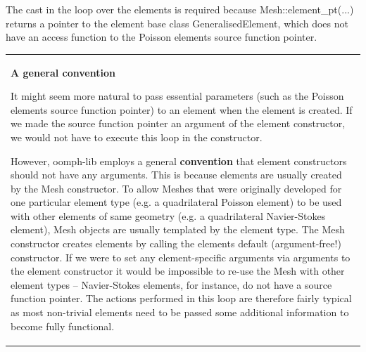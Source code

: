 The cast in the loop over the elements is required because {\ttfamily Mesh\+::element\+\_\+pt}(...) returns a pointer to the element base class {\ttfamily Generalised\+Element}, which does not have an access function to the Poisson element\textquotesingle{}s source function pointer.

\tabulinesep=1mm
\begin{longtabu} spread 0pt [c]{*{1}{|X[-1]}|}
\hline
\begin{center}{\bfseries \label{index_const_conv}%
%
A general convention}\end{center}  It might seem more natural to pass essential parameters (such as the Poisson element\textquotesingle{}s source function pointer) to an element when the element is created. If we made the source function pointer an argument of the element constructor, we would not have to execute this loop in the constructor.

However, {\ttfamily oomph-\/lib} employs a general {\bfseries convention} that element constructors should not have any arguments. This is because elements are usually created by the {\ttfamily Mesh} constructor. To allow {\ttfamily Meshes} that were originally developed for one particular element type (e.\+g. a quadrilateral Poisson element) to be used with other elements of same geometry (e.\+g. a quadrilateral Navier-\/\+Stokes element), {\ttfamily Mesh} objects are usually templated by the element type. The {\ttfamily Mesh} constructor creates elements by calling the element\textquotesingle{}s default (argument-\/free!) constructor. If we were to set any element-\/specific arguments via arguments to the element constructor it would be impossible to re-\/use the {\ttfamily Mesh} with other element types -- Navier-\/\+Stokes elements, for instance, do not have a source function pointer. The actions performed in this loop are therefore fairly typical as most non-\/trivial elements need to be passed some additional information to become fully functional.

\\
\end{longtabu}




 

